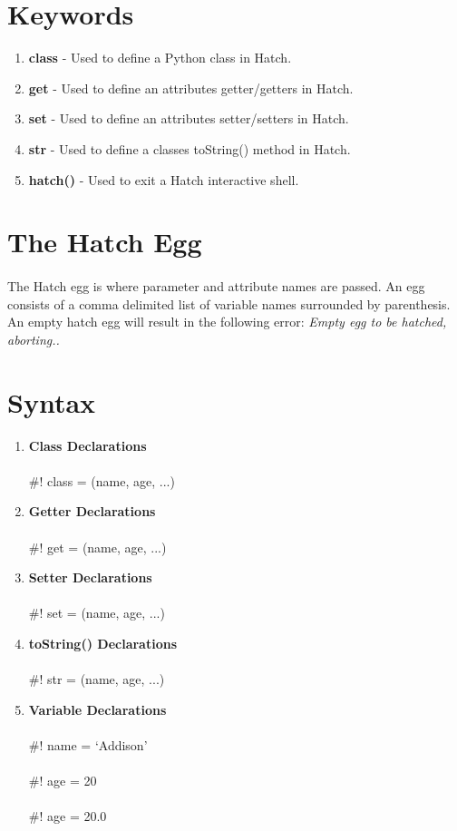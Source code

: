 \documentclass[12pt]{article}
\begin{document}
\section{Keywords}
\begin{enumerate}
\item{\textbf{class}}
- Used to define a Python class in Hatch.
\item{\textbf{get}}
- Used to define an attributes getter/getters in Hatch.
\item{\textbf{set}}
- Used to define an attributes setter/setters in Hatch.
\item{\textbf{str}}
- Used to define a classes toString() method in Hatch.
\item{\textbf{hatch()}}
- Used to exit a Hatch interactive shell.
\end{enumerate}

\section{The Hatch Egg}
\paragraph{}The Hatch egg is where parameter and attribute names are passed.  An egg consists of a comma delimited list of variable names surrounded by parenthesis.  An empty hatch egg will result in the following error: \textit{Empty egg to be hatched, aborting..}

\section{Syntax}
\begin{enumerate}
\item{\textbf{Class Declarations}} \\ \\
\#! class = (name, age, ...)
\item{\textbf{Getter Declarations}} \\ \\
\#! get = (name, age, ...)
\item{\textbf{Setter Declarations}} \\ \\
\#! set = (name, age, ...)
\item{\textbf{toString() Declarations}} \\ \\
\#! str = (name, age, ...)
\item{\textbf{Variable Declarations}} \\ \\
\#! name = `Addison' \\ \\
\#! age = 20 \\ \\
\#! age = 20.0 \\ \\
\end{enumerate}
\end{document}
